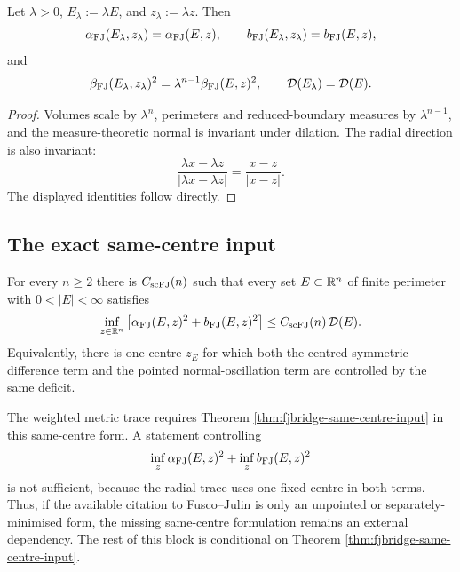 \begin{lemma}
\label{lem:fjbridge-scaling}
Let \(\lambda>0\), \(E_\lambda:=\lambda E\), and
\(z_\lambda:=\lambda z\).  Then
\[
   \alpha_{\rm FJ}(E_\lambda,z_\lambda)
      =\alpha_{\rm FJ}(E,z),
   \qquad
   b_{\rm FJ}(E_\lambda,z_\lambda)
      =b_{\rm FJ}(E,z),
\]
and
\[
   \beta_{\rm FJ}(E_\lambda,z_\lambda)^2
      =\lambda^{n-1}\beta_{\rm FJ}(E,z)^2,
   \qquad
   \mathcal D(E_\lambda)=\mathcal D(E).
\]
\end{lemma}

\begin{proof}
Volumes scale by \(\lambda^n\), perimeters and reduced-boundary
measures by \(\lambda^{n-1}\), and the measure-theoretic normal is
invariant under dilation.  The radial direction is also invariant:
\[
   \frac{\lambda x-\lambda z}{|\lambda x-\lambda z|}
   =\frac{x-z}{|x-z|}.
\]
The displayed identities follow directly.
\end{proof}

\subsection{The exact same-centre input}
\label{ssec:fjbridge-same-centre-input}

\begin{theorem}
\label{thm:fjbridge-same-centre-input}
For every \(n\ge2\) there is \(C_{\rm scFJ}(n)\) such that every
set \(E\subset\mathbb{R}^n\) of finite perimeter with \(0<|E|<\infty\)
satisfies
\[
   \inf_{z\in\mathbb{R}^n}
   \left[
      \alpha_{\rm FJ}(E,z)^2+b_{\rm FJ}(E,z)^2
   \right]
   \le C_{\rm scFJ}(n)\,\mathcal D(E).
\]
Equivalently, there is one centre \(z_E\) for which both the centred
symmetric-difference term and the pointed normal-oscillation term are
controlled by the same deficit.
\end{theorem}

\begin{remark}
\label{rem:fjbridge-input-status}
The weighted metric trace requires Theorem
\ref{thm:fjbridge-same-centre-input} in this same-centre form.  A
statement controlling
\[
   \inf_z \alpha_{\rm FJ}(E,z)^2+\inf_z b_{\rm FJ}(E,z)^2
\]
is not sufficient, because the radial trace uses one fixed centre in
both terms.  Thus, if the available citation to Fusco--Julin
\cite[Thm.~1.1]{FJ2014} is only an unpointed or separately-minimised
form, the missing same-centre formulation remains an external
dependency.  The rest of this block is conditional on Theorem
\ref{thm:fjbridge-same-centre-input}.
\end{remark}

